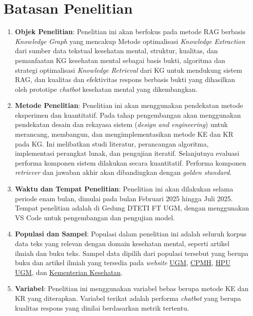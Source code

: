\section{Batasan Penelitian}
\begin{enumerate}
	\item \textbf{Objek Penelitian}: Penelitian ini akan berfokus pada metode RAG berbasis \textit{Knowledge Graph} yang mencakup
	      Metode optimalisasi \textit{Knowledge Extraction} dari sumber data tekstual kesehatan mental,
	      struktur, kualitas, dan pemanfaatan KG kesehatan mental sebagai basis bukti,
	      algoritma dan strategi optimalisasi \textit{Knowledge Retrieval} dari KG untuk mendukung sistem RAG, dan
	      kualitas dan efektivitas respons berbasis bukti yang dihasilkan oleh prototipe \textit{chatbot} kesehatan mental yang dikembangkan.
	\item \textbf{Metode Penelitian}: Penelitian ini akan menggunakan pendekatan metode eksperimen dan kuantitatif.
	      Pada tahap pengembangan akan menggunakan pendekatan desain dan rekayasa sistem (\textit{design and engineering}) untuk merancang, membangun, dan mengimplementasikan metode KE dan KR pada KG.
	      Ini melibatkan studi literatur, perancangan algoritma, implementasi perangkat lunak, dan pengujian iteratif.
	      Selanjutnya evaluasi performa komponen sistem dilakukan secara kuantitatif.
	      Performa komponen \textit{retriever} dan jawaban akhir akan dibandingkan dengan \textit{golden standard}.
	\item \textbf{Waktu dan Tempat Penelitian}: Penelitian ini akan dilakukan selama periode enam bulan, dimulai pada bulan Februari 2025 hingga Juli 2025. Tempat penelitian adalah di Gedung DTETI FT UGM, dengan menggunakan VS Code untuk pengembangan dan pengujian model.
	\item	\textbf{Populasi dan Sampel}: Populasi dalam penelitian ini adalah seluruh korpus data teks yang relevan dengan domain kesehatan mental, seperti artikel ilmiah dan buku teks.
	      Sampel data dipilih dari populasi tersebut yang berupa buku dan artikel ilmiah yang tersedia pada \textit{website} \href{https://ugm.ac.id/}{UGM}, \href{https://cpmh.psikologi.ugm.ac.id/}{CPMH}, \href{https://hpu.ugm.ac.id}{HPU UGM}, dan \href{https://repository.kemkes.go.id/}{Kementerian Kesehatan}.
	\item	\textbf{Variabel}: Penelitian ini menggunakan variabel bebas berupa metode KE dan KR yang diterapkan.
	      Variabel terikat adalah performa \textit{chatbot} yang berupa kualitas respons yang dinilai berdasarkan metrik tertentu.

\end{enumerate}
